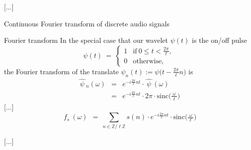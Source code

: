 \documentclass[11pt, a4paper]{article}
\begin{document}
\begin{section}{[...]}
\begin{subsection}{Continuous Fourier transform of discrete audio signals}
\begin{subsubsection}{Fourier transform}
In the special case that our wavelet $\psi(t)$ is the on/off pulse
$$
\psi(t)
\ =\ 
\left\{
\begin{array}{cll}
1 & \!\!\text{if}\ 0\le t<\tfrac{2\pi}{\ell}, \\
0 & \!\!\text{otherwise,}
\end{array}
\right.
$$
the Fourier transform of the translate $\psi_{n}(t):=\psi\big(t\!-\!\tfrac{2\pi}{\ell}n\big)$ is
$$
\begin{array}{rcl}
\!\!\widehat{\ \psi\ }\!\!{}_{n}(\omega)
&\!\!=\!\!&
e^{-i\tfrac{2\pi}{\ell}nt}\cdot\widehat{\ \psi\ }\!\!(\omega)
\\
&\!\!=\!\!&
e^{-i\tfrac{2\pi}{\ell}nt}\cdot2\pi\cdot\text{sinc}\big(\tfrac{\ \!\omega\ \!}{\ell}\big)
\end{array}
$$
[...]
$$
\widehat{\ f_{\!s}\ }\!\!(\omega)
\ \ =\ 
\sum_{n\in\mathbb{Z}/\ell\mathbb{Z}}\!\!s(n)\cdot e^{-i\tfrac{2\pi}{\ell}nt}\cdot\text{sinc}\big(\tfrac{\ \!\omega\ \!}{\ell}\big)
$$

\end{subsubsection}




[...]
\end{subsection}

\end{section}

\cite{NeoRie}
\cite{Geo}
\cite{Cohn}




\end{document}
